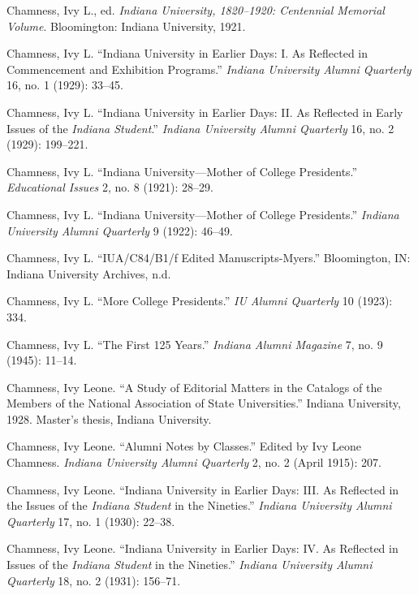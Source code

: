 \documentclass[
  american,
  letterpaper,
]{scrreprt}
\newlength{\cslhangindent}
\newenvironment{CSLReferences}[2] %
 {\begin{list}{}{%
  \setlength{\itemindent}{0pt}
  \setlength{\leftmargin}{0pt}
  \setlength{\parsep}{0pt}
  \ifodd #1
   \setlength{\leftmargin}{\cslhangindent}
   \setlength{\itemindent}{-1\cslhangindent}
  \fi
  \setlength{\itemsep}{#2\baselineskip}}}
 {\end{list}}
\begin{document}
\begin{CSLReferences}{1}{0}
Chamness, Ivy L., ed. \emph{Indiana University, 1820--1920: Centennial
Memorial Volume}. Bloomington: Indiana University, 1921.

Chamness, Ivy L. {``Indiana University in Earlier Days: I. As Reflected
in Commencement and Exhibition Programs.''} \emph{Indiana University
Alumni Quarterly} 16, no. 1 (1929): 33--45.

Chamness, Ivy L. {``Indiana University in Earlier Days: II. As Reflected
in Early Issues of the \emph{Indiana Student}.''} \emph{Indiana
University Alumni Quarterly} 16, no. 2 (1929): 199--221.

Chamness, Ivy L. {``Indiana University---Mother of College
Presidents.''} \emph{Educational Issues} 2, no. 8 (1921): 28--29.

Chamness, Ivy L. {``Indiana University---Mother of College
Presidents.''} \emph{Indiana University Alumni Quarterly} 9 (1922):
46--49.

Chamness, Ivy L. {``IUA/C84/B1/f Edited Manuscripts-Myers.''}
Bloomington, IN: Indiana University Archives, n.d.

Chamness, Ivy L. {``More College Presidents.''} \emph{IU Alumni
Quarterly} 10 (1923): 334.

Chamness, Ivy L. {``The First 125 Years.''} \emph{Indiana Alumni
Magazine} 7, no. 9 (1945): 11--14.

Chamness, Ivy Leone. {``A Study of Editorial Matters in the Catalogs of
the Members of the National Association of State Universities.''}
Indiana University, 1928. Master's thesis, Indiana University.

Chamness, Ivy Leone. {``Alumni Notes by Classes.''} Edited by Ivy Leone
Chamness. \emph{Indiana University Alumni Quarterly} 2, no. 2 (April
1915): 207.

Chamness, Ivy Leone. {``Indiana University in Earlier Days: III. As
Reflected in the Issues of the \emph{Indiana Student} in the
Nineties.''} \emph{Indiana University Alumni Quarterly} 17, no. 1
(1930): 22--38.

Chamness, Ivy Leone. {``Indiana University in Earlier Days: IV. As
Reflected in Issues of the \emph{Indiana Student} in the Nineties.''}
\emph{Indiana University Alumni Quarterly} 18, no. 2 (1931): 156--71.


\end{CSLReferences}
\end{document}
